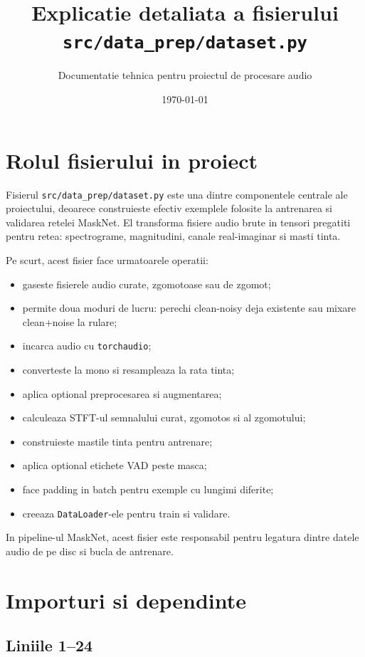 \documentclass[12pt,a4paper]{report}
\title{Explicatie detaliata a fisierului \texttt{src/data\_prep/dataset.py}}
\author{Documentatie tehnica pentru proiectul de procesare audio}
\date{\today}
\begin{document}
\maketitle
\tableofcontents

\chapter{Rolul fisierului in proiect}

Fisierul \texttt{src/data\_prep/dataset.py} este una dintre componentele centrale ale proiectului, deoarece construieste efectiv exemplele folosite la antrenarea si validarea retelei MaskNet. El transforma fisiere audio brute in tensori pregatiti pentru retea: spectrograme, magnitudini, canale real-imaginar si masti tinta.

Pe scurt, acest fisier face urmatoarele operatii:

\begin{itemize}
    \item gaseste fisierele audio curate, zgomotoase sau de zgomot;
    \item permite doua moduri de lucru: perechi clean-noisy deja existente sau mixare clean+noise la rulare;
    \item incarca audio cu \texttt{torchaudio};
    \item converteste la mono si resampleaza la rata tinta;
    \item aplica optional preprocesarea si augmentarea;
    \item calculeaza STFT-ul semnalului curat, zgomotos si al zgomotului;
    \item construieste mastile tinta pentru antrenare;
    \item aplica optional etichete VAD peste masca;
    \item face padding in batch pentru exemple cu lungimi diferite;
    \item creeaza \texttt{DataLoader}-ele pentru train si validare.
\end{itemize}

In pipeline-ul MaskNet, acest fisier este responsabil pentru legatura dintre datele audio de pe disc si bucla de antrenare.

\chapter{Importuri si dependinte}

\section{Liniile 1--24}
\end{document}

